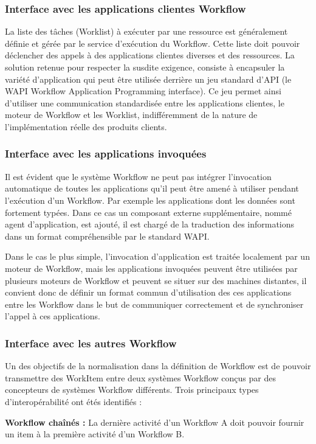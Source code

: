 \subsubsection{Interface avec les applications clientes Workflow }
La liste des tâches (Worklist) à exécuter par une ressource est généralement définie et gérée par le service d’exécution du Workflow. Cette liste doit pouvoir déclencher des appels à
des applications clientes diverses et des ressources. La solution retenue pour respecter la susdite exigence, consiste à encapsuler la variété d’application qui peut être utilisée derrière un jeu standard d'API (le WAPI Workflow Application Programming interface). Ce jeu permet ainsi d’utiliser une communication standardisée entre les applications clientes, le moteur de Workflow et les Worklist, indifféremment de la nature de l’implémentation réelle des produits
clients. 
\subsubsection{Interface avec les applications invoquées}
Il est évident que le système Workflow ne peut pas intégrer l’invocation automatique de
toutes les applications qu’il peut être amené à utiliser pendant l’exécution d’un Workflow. Par
exemple les applications dont les données sont fortement typées. Dans ce cas un composant
externe supplémentaire, nommé agent d’application, est ajouté, il est chargé de la traduction
des informations dans un format compréhensible par le standard WAPI. 

Dans le cas le plus simple, l'invocation d'application est traitée localement par un moteur
de Workflow, mais les applications invoquées peuvent être utilisées par plusieurs moteurs de
Workflow et peuvent se situer sur des machines distantes, il convient donc de définir un format commun d’utilisation des ces applications entre les Workflow dans le but de communiquer correctement et de synchroniser l’appel à ces applications. 

\subsubsection{Interface avec les autres Workflow }
Un des objectifs de la normalisation dans la définition de Workflow est de pouvoir
transmettre des WorkItem entre deux systèmes Workflow conçus par des concepteurs de systèmes Workflow différents. Trois principaux types d’interopérabilité ont étés identifiés : 

\textbf{Workflow chaînés :} La dernière activité d’un Workflow A doit pouvoir fournir un item à la première activité d’un Workflow B.

